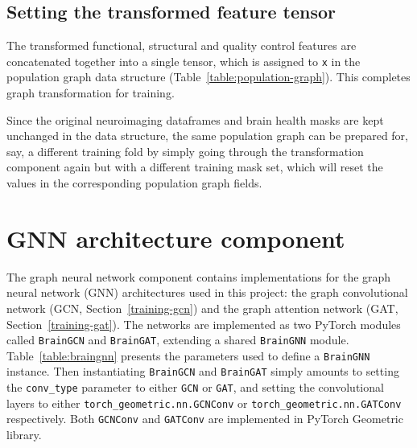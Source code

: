 \subsection{Setting the transformed feature tensor}
The transformed functional, structural and quality control features are concatenated together into a single tensor, which is assigned to \texttt{x} in the population graph data structure (Table~\ref{table:population-graph}). This completes graph transformation for training.

Since the original neuroimaging dataframes and brain health masks are kept unchanged in the data structure, the same population graph can be prepared for, say, a different training fold by simply going through the transformation component again but with a different training mask set, which will reset the values in the corresponding population graph fields.

\section{GNN architecture component}

The graph neural network component contains implementations for the graph neural network (GNN) architectures used in this project: the graph convolutional network (GCN, Section~\ref{training-gcn}) and the graph attention network (GAT, Section~\ref{training-gat}). The networks are implemented as two PyTorch modules called \texttt{BrainGCN} and \texttt{BrainGAT}, extending a shared \texttt{BrainGNN} module. Table~\ref{table:braingnn} presents the parameters used to define a \texttt{BrainGNN} instance. Then instantiating \texttt{BrainGCN} and \texttt{BrainGAT} simply amounts to setting the \texttt{conv\_type} parameter to either \texttt{GCN} or \texttt{GAT}, and setting the convolutional layers to either \texttt{torch\_geometric.nn.GCNConv} or \texttt{torch\_geometric.nn.GATConv} respectively. Both \texttt{GCNConv} and \texttt{GATConv} are implemented in PyTorch Geometric library.


